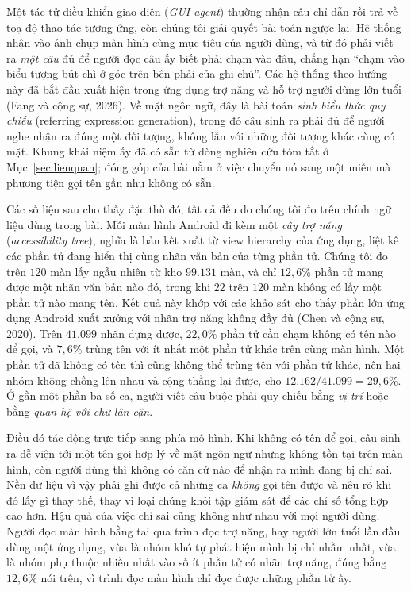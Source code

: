 \documentclass[12pt,a4paper,onecolumn]{article}
\newcommand{\ôvuông}[2]{\tikz[baseline=-0.45ex]{\draw[#1,line width=0.9pt,#2] (0,0) rectangle (0.34,0.18);}}
\begin{document}
Một tác tử điều khiển giao diện (\emph{GUI agent}) thường nhận câu chỉ dẫn rồi trả về toạ
độ thao tác tương ứng, còn chúng tôi giải quyết bài toán ngược lại. Hệ thống nhận vào ảnh chụp
màn hình cùng mục tiêu của người dùng, và từ đó phải viết ra \emph{một câu} đủ để người đọc
câu ấy biết phải chạm vào đâu, chẳng hạn ``chạm vào biểu tượng bút chì ở góc trên bên phải
của ghi chú''. Các hệ thống theo hướng này đã bắt đầu xuất hiện trong ứng dụng trợ
năng và hỗ trợ người dùng lớn tuổi (Fang và cộng sự, 2026). Về mặt ngôn ngữ, đây là bài
toán \emph{sinh biểu thức quy chiếu} (referring expression generation), trong đó câu sinh ra
phải đủ để người nghe nhận ra đúng một đối tượng, không lẫn với những đối tượng khác
cùng có mặt. Khung khái niệm
ấy đã có sẵn từ dòng nghiên cứu tóm tắt ở Mục~\ref{sec:lienquan}; đóng góp của bài nằm ở
việc chuyển nó sang một miền mà phương tiện gọi tên gần như không có sẵn.

Các số liệu sau cho thấy đặc thù đó, tất cả đều do chúng tôi đo trên chính ngữ liệu dùng
trong bài. Mỗi màn hình Android đi kèm một \emph{cây trợ năng} (\emph{accessibility tree}), nghĩa là
bản kết xuất từ view hierarchy của ứng dụng, liệt kê các phần tử đang hiển thị cùng nhãn
văn bản của từng phần tử. Chúng tôi đo trên $120$ màn lấy ngẫu nhiên từ kho $99.131$ màn,
và chỉ $12{,}6\%$ phần tử mang được một nhãn văn bản nào đó, trong khi $22$ trên $120$ màn
không có lấy một phần tử nào mang tên. Kết quả
này khớp với các khảo sát cho thấy phần lớn ứng dụng Android xuất xưởng với nhãn trợ năng
không đầy đủ (Chen và cộng sự, 2020). Trên $41.099$ nhãn dựng được, $22{,}0\%$ phần tử cần chạm không có tên nào để gọi, và
$7{,}6\%$ trùng tên với ít nhất một phần tử khác trên cùng màn hình. Một phần tử đã không có tên thì cũng không thể trùng tên với phần tử khác,
nên hai nhóm không chồng lên nhau và cộng thẳng lại được, cho
$12.162/41.099 = 29{,}6\%$. Ở
gần một phần ba số ca, người viết câu buộc phải quy chiếu bằng \emph{vị trí} hoặc bằng
\emph{quan hệ với chữ lân cận}.

Điều đó tác động trực tiếp sang phía mô hình. Khi không có tên để gọi, câu sinh ra dễ
viện
tới một tên gọi hợp lý về mặt ngôn ngữ nhưng không tồn tại trên màn hình, còn người dùng
thì không có căn cứ nào để nhận ra mình đang bị chỉ sai. Nền dữ liệu vì vậy phải ghi được
cả những ca \emph{không} gọi tên được và nêu rõ khi đó lấy gì thay thế, thay vì loại chúng
khỏi tập giám sát để các chỉ số tổng hợp cao hơn. Hậu quả của việc chỉ sai cũng không như nhau với mọi người dùng. Người đọc màn hình bằng
tai qua trình đọc trợ năng, hay người lớn tuổi lần đầu dùng một ứng dụng, vừa là nhóm khó
tự phát hiện mình bị chỉ nhầm nhất, vừa là nhóm phụ thuộc nhiều nhất vào số ít phần tử có
nhãn trợ năng, đúng bằng $12{,}6\%$ nói trên, vì trình đọc màn hình chỉ đọc được những phần
tử ấy.
\end{document}
